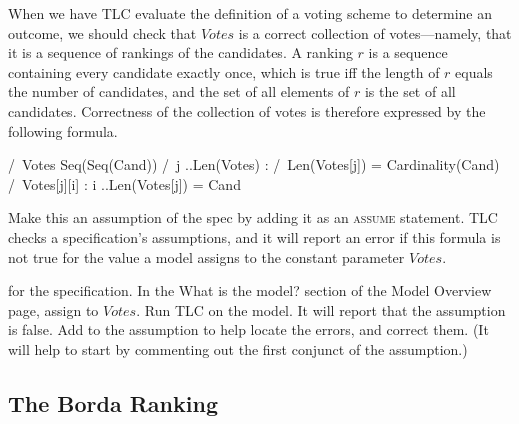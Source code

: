\documentclass[fleqn,leqno]{article}
\begin{document}
When we have TLC evaluate the definition of a voting scheme to
determine an outcome, we should check that $Votes$ is a correct
collection of votes---namely, that it is a sequence of rankings of the
candidates.  A ranking $r$ is a sequence containing every candidate
exactly once, which is true iff the length of $r$ equals the number of
candidates, and the set of all elements of $r$ is the set of all
candidates.  Correctness of the collection of votes is therefore
expressed by the following formula.
\begin{display}
\begin{notla}
/\ Votes \in Seq(Seq(Cand))
/\ \A j ..Len(Votes) : 
      /\ Len(Votes[j]) = Cardinality(Cand)
      /\ {Votes[j][i] : i ..Len(Votes[j])} = Cand
\end{notla}
\begin{tlatex}
%
%
\end{tlatex}
\end{display}
Make this an assumption of the spec by adding it as an 
\textsc{assume} statement.  TLC checks a specification's assumptions,
and it will report an error if this formula is not true for the value
a model assigns to the constant parameter $Votes$.

\begin{question} 
 for the specification.
In the \textsf{What is the model?} section of the \textsf{Model
Overview} page, assign 
to $Votes$.  Run TLC on the model.  It will report that the
assumption is false.  Add  to the assumption to help locate the errors, and correct
them.  (It will help to start by commenting out the first conjunct of
the assumption.)
\end{question}






\subsection[The Borda Ranking]{The Borda Ranking%
   }
\end{document}
